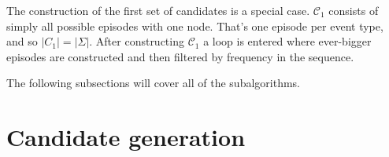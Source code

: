 The construction of the first set of candidates is a special case. $ \mathcal{C}_1 $ consists of simply all possible episodes with one node. That's one episode per event type, and so $ | C_1 | = | \Sigma | $. After constructing $ \mathcal{C}_1 $ a loop is entered where ever-bigger episodes are constructed and then filtered by frequency in the sequence.

The following subsections will cover all of the subalgorithms.

\section{Candidate generation}
\label{sec:cand-gen}


